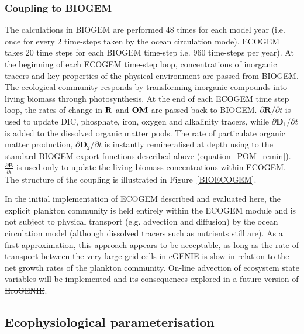 \documentclass[gmd, manuscript]{copernicus}
\newcommand{\matr}[1]{\mathbf{#1}}
\providecommand{\DIFadd}[1]{{\protect\color{blue}\uwave{#1}}} %
\providecommand{\DIFdel}[1]{{\protect\color{red}\sout{#1}}}                      %
\providecommand{\DIFaddbegin}{} %
\providecommand{\DIFaddend}{} %
\providecommand{\DIFdelbegin}{} %
\providecommand{\DIFdelend}{} %
\begin{document}
\subsubsection{Coupling to BIOGEM}

The calculations in BIOGEM are performed 48 times for each model year (i.e. once for every 2 time-steps taken by the ocean circulation mode). ECOGEM takes 20 time steps for each BIOGEM time-step i.e. 960 time-steps per year). At the beginning of each ECOGEM time-step loop, concentrations of inorganic tracers and key properties of the physical environment are passed from BIOGEM. The ecological community responds by transforming inorganic compounds into living biomass through photosynthesis. At the end of each ECOGEM time step loop, the rates of change in $\bf{R}$ and $\bf{OM}$ are passed back to BIOGEM. ${\partial {\matr R}}/{\partial t}$ is used to update DIC, phosphate, iron, oxygen and alkalinity tracers, while ${\partial {\matr D}_1}/{\partial t}$ is added to the dissolved organic matter pools. The rate of particulate organic matter production, ${\partial {\matr D}_2}/{\partial t}$ is instantly remineralised at depth using to the standard BIOGEM export functions described above (equation~\ref{POM_remin}). $\frac{\partial {\matr B}}{\partial t}$ is used only to update the living biomass concentrations within ECOGEM. The structure of the coupling is illustrated in Figure~\ref{BIOECOGEM}.





In the initial implementation of ECOGEM described and evaluated here, the explicit plankton community is held entirely within the ECOGEM module and is not subject to physical transport (e.g. advection and diffusion) by the ocean circulation model (although dissolved tracers such as nutrients still are). As a first approximation, this approach appears to be acceptable, as long as the rate of transport between the very large grid cells in \DIFdelbegin \DIFdel{cGENIE }\DIFdelend \DIFaddbegin \DIFadd{cGEnIE }\DIFaddend is slow in relation to the net growth rates of the plankton community. On-line advection of ecosystem state variables will be implemented and its consequences explored in a future version of \DIFdelbegin \DIFdel{EcoGENIE}\DIFdelend \DIFaddbegin \DIFadd{EcoGEnIE}\DIFaddend . 

\subsection{Ecophysiological parameterisation}\label{Parameters}
\end{document}
